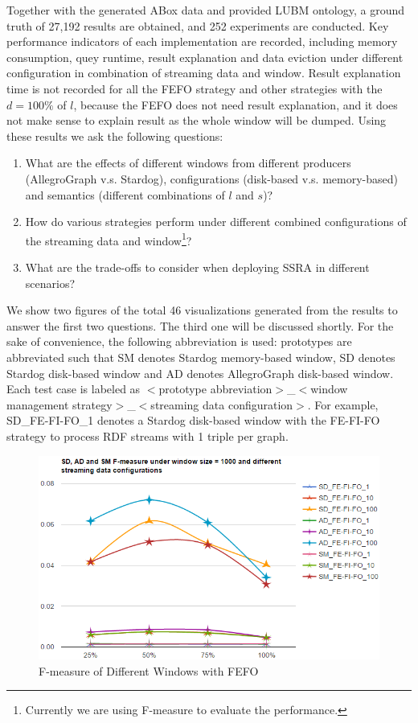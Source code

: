 Together with the generated ABox data and provided LUBM ontology, a ground truth of 27,192 results are obtained, and 252 experiments are conducted.
Key performance indicators of each implementation are recorded, including memory consumption, quey runtime, result explanation and data eviction under different configuration in combination of streaming data and window. 
Result explanation time is not recorded for all the FEFO strategy and other strategies with the $d = 100\%$ of $l$, because the FEFO does not need result explanation, and it does not make sense to explain result as the whole window will be dumped. 
Using these results we ask the following questions:
\begin{enumerate}
	\item What are the effects of different windows from different producers (AllegroGraph v.s. Stardog), configurations (disk-based v.s. memory-based) and semantics (different combinations of $l$ and $s$)?
    \item How do various strategies perform under different combined configurations of the streaming data and window\footnote{Currently we are using F-measure to evaluate the performance.}?
    \item What are the trade-offs to consider when deploying SSRA in different scenarios?
\end{enumerate}

We show two figures of the total 46 visualizations \cite{ssragithub} generated from the results to answer the first two questions. 
The third one will be discussed shortly. 
For the sake of convenience, the following abbreviation is used: 
prototypes are abbreviated such that SM denotes Stardog memory-based window, SD denotes Stardog disk-based window and AD denotes AllegroGraph disk-based window. 
Each test case is labeled as $<$prototype abbreviation$>$\_$<$window management strategy$>$\_$<$streaming data configuration$>$. 
For example, SD\_FE-FI-FO\_1 denotes a Stardog disk-based window with the FE-FI-FO strategy to process RDF streams with 1 triple per graph.

\begin{figure}[!htbp]
	\centering
	\includegraphics[width=5in]{img/4-ff.png}
	\caption{F-measure of Different Windows with FEFO}
	\label{fig:fefo}
\end{figure}

